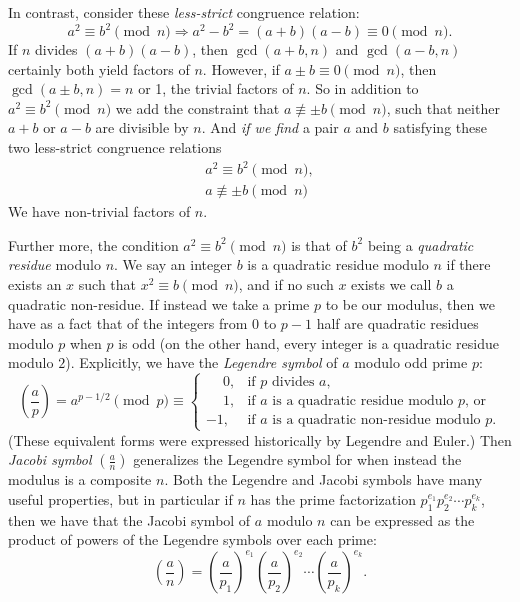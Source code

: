 \documentclass{report}
\begin{document}
In contrast, consider these \emph{less-strict} congruence relation:
\[
    a^2 \equiv b^2 \pmod n
    \Rightarrow
    a^2-b^2 = (a+b)(a-b) \equiv 0 \pmod n.
\]
If $n$ divides $(a+b)(a-b)$, then $\gcd(a+b,n)$ and $\gcd(a-b,n)$ certainly both yield factors of
$n$. However, if $a\pm b\equiv 0\pmod n$, then $\gcd(a\pm b,n)=n$ or 1, the trivial factors of $n$.
So in addition to $a^2\equiv b^2\pmod n$ we add the constraint that $a\not\equiv\pm b\pmod n$, such
that neither $a+b$ or $a-b$ are divisible by $n$. And \emph{if we find} a pair $a$ and $b$
satisfying these two less-strict congruence relations
\begin{gather}
    a^2 \equiv b^2 \pmod n, \label{eq:square-congruence1} \\
    a \not\equiv \pm b \pmod n \label{eq:square-congruence2}
\end{gather}
We have non-trivial factors of $n$.

Further more, the condition $a^2\equiv b^2\pmod n$ is that of $b^2$ being a \emph{quadratic residue}
modulo $n$. We say an integer $b$ is a quadratic residue modulo $n$ if there exists an $x$ such that
$x^2\equiv b\pmod n$, and if no such $x$ exists we call $b$ a quadratic non-residue.
If instead we take a prime $p$ to be our modulus, then we have as a fact
that of the integers from $0$ to $p-1$ half are quadratic residues modulo $p$ when $p$ is odd
(on the other hand, every integer is a quadratic residue modulo $2$).
Explicitly, we have the \emph{Legendre symbol} of $a$ modulo odd prime $p$:
\begin{equation}
    \left(\frac{a}{p}\right)
    = a^{p-1/2}\pmod p
    \equiv \begin{cases}
        \phantom{-}0, & \text{if $p$ divides $a$,} \\
        \phantom{-}1, & \text{if $a$ is a quadratic residue modulo $p$, or} \\
        -1, & \text{if $a$ is a quadratic non-residue modulo $p$.}
    \end{cases}
\end{equation}
(These equivalent forms were expressed historically by Legendre and Euler.)
Then \emph{Jacobi symbol} $\left(\frac{a}{n}\right)$ generalizes the Legendre symbol for
when instead the modulus is a composite $n$. Both the Legendre and Jacobi symbols have many
useful properties, but in particular if $n$ has the prime factorization
$p_1^{e_1}p_2^{e_2}\cdots p_k^{e_k}$, then we have that the Jacobi symbol of $a$ modulo $n$
can be expressed as the product of powers of the Legendre symbols over each prime:
\begin{equation}
    \left(\frac{a}{n}\right) =
    {\left(\frac{a}{p_1}\right)}^{e_1}
    {\left(\frac{a}{p_2}\right)}^{e_2}
    \cdots
    {\left(\frac{a}{p_k}\right)}^{e_k}.
\end{equation}
\end{document}
